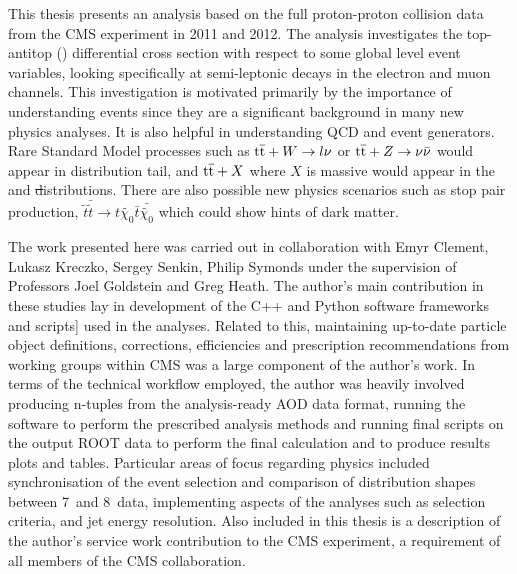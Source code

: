 This thesis presents an analysis based on the full proton-proton collision data from the CMS experiment in
2011 and 2012. The analysis investigates the top-antitop (\ttbar) differential cross section with respect to
some global level event variables, looking specifically at semi-leptonic \ttbar decays in the electron and
muon channels. This investigation is motivated primarily by the importance of understanding \ttbar events since they are a
significant background in many new physics analyses. It is also helpful in understanding QCD and event
generators. Rare Standard Model processes such as $\mathrm{t}\overline{\mathrm{t}} + W\rightarrow l\nu$ or $\mathrm{t}\overline{\mathrm{t}} + Z\rightarrow
\nu\bar{\nu}$ would appear in \met distribution tail, and $\mathrm{t}\overline{\mathrm{t}} + X$ where $X$ is massive would appear in
the \HT and \st distributions. There are also possible new physics scenarios such as stop pair production,
$\tilde{t}\bar{\tilde{t}} \rightarrow t\tilde{\chi_0} \bar{t}\bar{\tilde{\chi_0}}$ which could show
hints of dark matter. 

The work presented here was carried out in collaboration with Emyr Clement, L{}ukasz Kreczko, Sergey Senkin,
Philip Symonds under the supervision of Professors Joel Goldstein and Greg Heath. The author's main
contribution in these studies lay in development of the C++ and Python software frameworks and scripts] used
in the analyses. Related to this, maintaining up-to-date particle object definitions, corrections,
efficiencies and prescription recommendations from working groups within CMS was a large component of the
author's work. In terms of the technical workflow employed, the author was heavily involved producing n-tuples
from the analysis-ready AOD data format, running the software to perform the prescribed analysis methods and
running final scripts on the output ROOT data to perform the final calculation and to produce results plots
and tables. Particular areas of focus regarding physics included synchronisation of the event selection and
comparison of distribution shapes between 7~\TeV and 8~\TeV data, implementing aspects of the analyses such as
selection criteria, \btagging and jet energy resolution. Also included in this thesis is a description of the
author's service work contribution to the CMS experiment, a requirement of all members of the CMS
collaboration.

